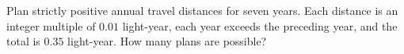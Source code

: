 Plan strictly positive annual travel distances for seven years. Each distance is an integer multiple of $0.01$ light-year, each year exceeds the preceding year, and the total is $0.35$ light-year. How many plans are possible?
